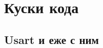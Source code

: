 \documentclass[12pt]{article}
\begin{document}
\newpage
\FloatBarrier
\section{Куски кода}

\subsection{}
\subsection{}
\subsection{Usart и еже с ним}
\subsection{}
\end{document}
